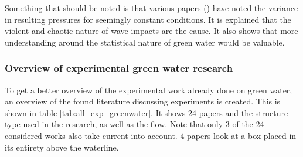 Something that should be noted is that various papers (\cite{Bullock2007,Bogaert2010,Bredmose2009,Peregrine2003,Abdussamie2017}) have noted the variance in resulting pressures for seemingly constant conditions. It is explained that the violent and chaotic nature of wave impacts are the cause. It also shows that more understanding around the statistical nature of green water would be valuable.





\subsubsection{Overview of experimental green water research}
\label{sec:lit_summary_exp_greenwater}
To get a better overview of the experimental work already done on green water, an overview of the found literature discussing experiments is created. This is shown in table \ref{tab:all_exp_greenwater}. It shows 24 papers and the structure type used in the research, as well as the flow. Note that only 3 of the 24 considered works also take current into account. 4 papers look at a box placed in its entirety above the waterline.


